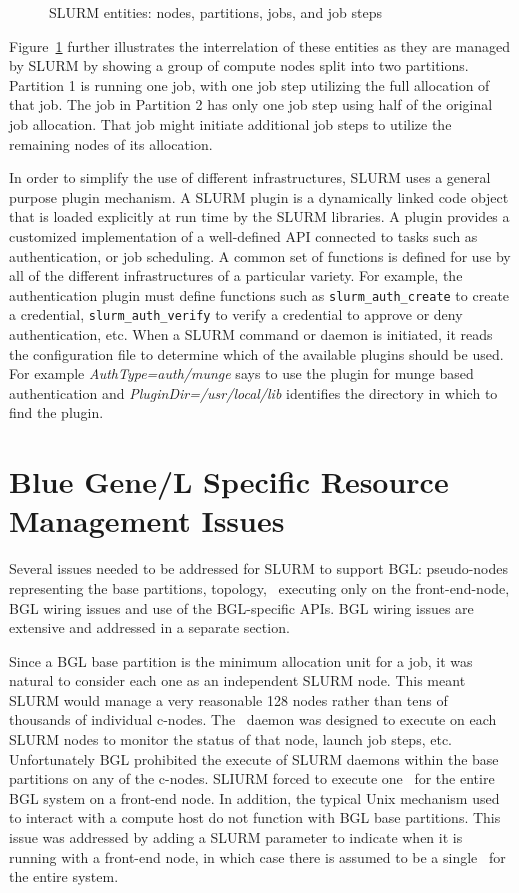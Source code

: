 \documentclass[10pt,onecolumn,times]{../common/llncs}
\begin{document}
{\begin{figure}[tcb]
\centerline{}
\caption{\small SLURM entities: nodes, partitions, jobs, and job steps}
\label{entities}
\end{figure}

Figure~\ref{entities} further illustrates the interrelation of these
entities as they are managed by SLURM by showing a group of
compute nodes split into two partitions. Partition 1 is running one job,
with one job step utilizing the full allocation of that job.  The job
in Partition 2 has only one job step using half of the original job
allocation.  That job might initiate additional job steps to utilize
the remaining nodes of its allocation.

In order to simplify the use of different infrastructures,
SLURM uses a general purpose plugin mechanism.  A SLURM plugin is a
dynamically linked code object that is loaded explicitly at run time
by the SLURM libraries.  A plugin provides a customized implementation
of a well-defined API connected to tasks such as authentication,
or job scheduling.  A common set of functions is defined
for use by all of the different infrastructures of a particular variety.
For example, the authentication plugin must define functions such as 
{\tt slurm\_auth\_create} to create a credential, {\tt slurm\_auth\_verify}
to verify a credential to approve or deny authentication, etc.  
When a SLURM command or daemon is initiated, it
reads the configuration file to determine which of the available plugins
should be used.  For example {\em AuthType=auth/munge} says to use the
plugin for munge based authentication and {\em PluginDir=/usr/local/lib}
identifies the directory in which to find the plugin.

\section {Blue Gene/L Specific Resource Management Issues}

Several issues needed to be addressed for SLURM to support BGL:
pseudo-nodes representing the base partitions, topology, 
\slurmd\ executing only on the front-end-node, 
BGL wiring issues and use of the BGL-specific APIs.
BGL wiring issues are extensive and addressed in a separate section.

Since a BGL base partition is the minimum allocation unit for a job, 
it was natural to consider each one as an independent SLURM node. 
This meant SLURM would manage a very reasonable 128 nodes 
rather than tens of thousands of individual c-nodes.
The \slurmd\ daemon was designed to execute on each SLURM 
nodes to monitor the status of that node, launch job steps, etc. 
Unfortunately BGL prohibited the execute of SLURM daemons within 
the base partitions on any of the c-nodes. 
SLIURM forced to execute one \slurmd\ for the entire BGL system 
on a front-end node.
In addition,  the typical Unix mechanism used to interact with a 
compute host do not function with BGL base partitions. 
This issue was addressed by adding a SLURM parameter to 
indicate when it is running with a front-end node, in which case 
there is assumed to be a single \slurmd\ for the entire system. 

}
\end{document}
